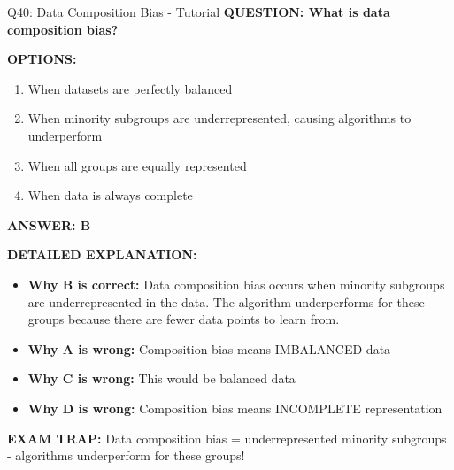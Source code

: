\documentclass[8pt]{beamer}
\begin{document}
	\begin{frame}{Q40: Data Composition Bias - Tutorial}
		\fontsize{6.5}{7.5}\selectfont
		\textbf{QUESTION: What is data composition bias?}
		
		\vspace{0.1cm}
		\textbf{OPTIONS:}
		\begin{enumerate}
			\item When datasets are perfectly balanced
			\item When minority subgroups are underrepresented, causing algorithms to underperform
			\item When all groups are equally represented
			\item When data is always complete
		\end{enumerate}
		
		\vspace{0.1cm}
		\textcolor{myblue}{\textbf{ANSWER: B}}
		
		\vspace{0.1cm}
		\textbf{DETAILED EXPLANATION:}
		\begin{itemize}
			\item \textbf{Why B is correct:} Data composition bias occurs when minority subgroups are underrepresented in the data. The algorithm underperforms for these groups because there are fewer data points to learn from.
			\item \textbf{Why A is wrong:} Composition bias means IMBALANCED data
			\item \textbf{Why C is wrong:} This would be balanced data
			\item \textbf{Why D is wrong:} Composition bias means INCOMPLETE representation
		\end{itemize}
		
		\textcolor{myred}{\textbf{EXAM TRAP:}} Data composition bias = \textcolor{myblue}{underrepresented minority subgroups} - algorithms underperform for these groups!
	\end{frame}
	
\end{document}
